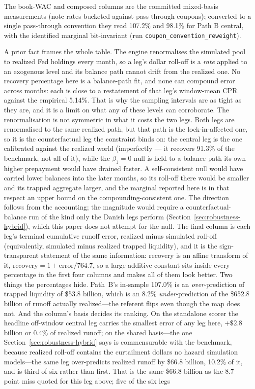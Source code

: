 \documentclass[12pt]{article}
\begin{document}
\begin{table}[H]
\begin{threeparttable}
\begin{tablenotes}[flushleft]
\item The book-WAC and composed columns are the committed mixed-basis measurements (note rates bucketed against pass-through coupons); converted to a single pass-through convention they read 107.2\% and 98.1\% for Path B central, with the identified marginal bit-invariant (run \texttt{coupon\_convention\_reweight}). \item A prior fact frames the whole table. The engine renormalises the simulated pool to realized Fed holdings every month, so a leg's dollar roll-off is a \emph{rate} applied to an exogenous level and its balance path cannot drift from the realized one. No recovery percentage here is a balance-path fit, and none can compound error across months: each is close to a restatement of that leg's window-mean CPR against the empirical 5.14\%. That is why the sampling intervals are as tight as they are, and it is a limit on what any of these levels can corroborate. The renormalisation is not symmetric in what it costs the two legs. Both legs are renormalised to the same realized path, but that path is the lock-in-affected one, so it is the counterfactual leg the constraint binds on: the central leg is the one calibrated against the realized world (imperfectly --- it recovers 91.3\% of the benchmark, not all of it), while the $\beta_1 = 0$ null is held to a balance path its own higher prepayment would have drained faster. A self-consistent null would have carried lower balances into the later months, so its roll-off there would be smaller and its trapped aggregate larger, and the marginal reported here is in that respect an upper bound on the compounding-consistent one. The direction follows from the accounting; the magnitude would require a counterfactual-balance run of the kind only the Danish legs perform (Section~\ref{sec:robustness-hybrid}), which this paper does not attempt for the null. The final column is each leg's terminal cumulative runoff error, realized minus simulated roll-off (equivalently, simulated minus realized trapped liquidity), and it is the sign-transparent statement of the same information: recovery is an affine transform of it, $\text{recovery} = 1 + \text{error}/764.7$, so a large additive constant sits inside every percentage in the first four columns and makes all of them look better. Two things the percentages hide. Path~B's in-sample 107.0\% is an \emph{over}-prediction of trapped liquidity of \$53.8 billion, which is an 8.2\% \emph{under}-prediction of the \$652.8 billion of runoff actually realized---the referent flips even though the map does not. And the column's basis decides its ranking. On the standalone scorer the headline off-window central leg carries the smallest error of any leg here, $+\$2.8$ billion or 0.4\% of realized runoff; on the shared basis---the one Section~\ref{sec:robustness-hybrid} says is commensurable with the benchmark, because realized roll-off contains the curtailment dollars no hazard simulation models---the same leg over-predicts realized runoff by \$66.8 billion, 10.2\% of it, and is third of six rather than first. That is the same \$66.8 billion as the 8.7-point miss quoted for this leg above; five of the six legs 
\end{tablenotes}
\end{threeparttable}
\end{table}
\end{document}
